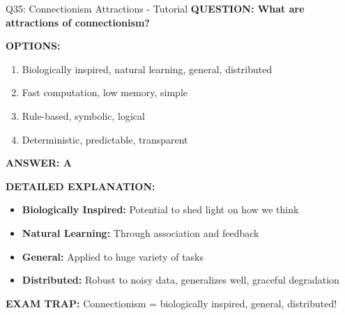 \documentclass[8pt]{beamer}
\begin{document}
	\begin{frame}{Q35: Connectionism Attractions - Tutorial}
		\fontsize{6.5}{7.5}\selectfont
		\textbf{QUESTION: What are attractions of connectionism?}
		
		\vspace{0.1cm}
		\textbf{OPTIONS:}
		\begin{enumerate}
			\item Biologically inspired, natural learning, general, distributed
			\item Fast computation, low memory, simple
			\item Rule-based, symbolic, logical
			\item Deterministic, predictable, transparent
		\end{enumerate}
		
		\vspace{0.1cm}
		\textcolor{myblue}{\textbf{ANSWER: A}}
		
		\vspace{0.1cm}
		\textbf{DETAILED EXPLANATION:}
		\begin{itemize}
			\item \textbf{Biologically Inspired:} Potential to shed light on how we think
			\item \textbf{Natural Learning:} Through association and feedback
			\item \textbf{General:} Applied to huge variety of tasks
			\item \textbf{Distributed:} Robust to noisy data, generalizes well, graceful degradation
		\end{itemize}
		
		\vspace{0.1cm}
		\textcolor{myred}{\textbf{EXAM TRAP:}} Connectionism = \textcolor{myblue}{biologically inspired, general, distributed}!
	\end{frame}
	
\end{document}
